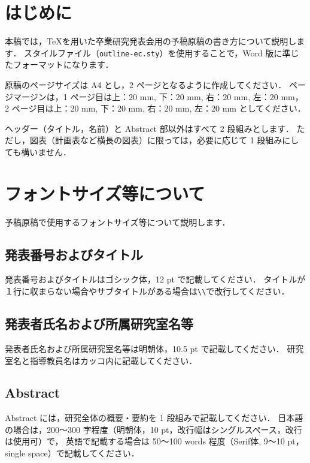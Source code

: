 \documentclass[twoside,twocolumn]{ujarticle}
\begin{document}
\maketitle

%
%
\section{はじめに}
%
本稿では，\TeX を用いた卒業研究発表会用の予稿原稿の書き方について説明します．
スタイルファイル（\texttt{outline-ec.sty}）を使用することで，Word 版に準じたフォーマットになります．

原稿のページサイズは A4 とし，2 ページとなるように作成してください．
ページマージンは，1 ページ目は上：20 mm, 下：20 mm, 右：20 mm, 左：20 mm，
2 ページ目は上：20 mm, 下：20 mm, 右：20 mm, 左：20 mm としてください．

ヘッダー（タイトル，名前）と Abstract 部以外はすべて 2 段組みとします．
ただし，図表（計画表など横長の図表）に限っては，必要に応じて 1 段組みにしても構いません．
%
%
\section{フォントサイズ等について}
%
予稿原稿で使用するフォントサイズ等について説明します．
%
%
\subsection{発表番号およびタイトル}
%
発表番号およびタイトルはゴシック体，12 pt で記載してください．
タイトルが１行に収まらない場合やサブタイトルがある場合は\verb|\\|で改行してください．
%
%
\subsection{発表者氏名および所属研究室名等}
%
発表者氏名および所属研究室名等は明朝体，10.5 pt で記載してください．
研究室名と指導教員名はカッコ内に記載してください．
%
%
\subsection{Abstract}
%
Abstract には，研究全体の概要・要約を 1 段組みで記載してください．
日本語の場合は，200〜300 字程度（明朝体，10 pt，改行幅はシングルスペース，改行は使用可）で，
英語で記載する場合は 50〜100 words 程度（Serif体, 9〜10 pt，single space）で記載してください．
%
%
\end{document}
